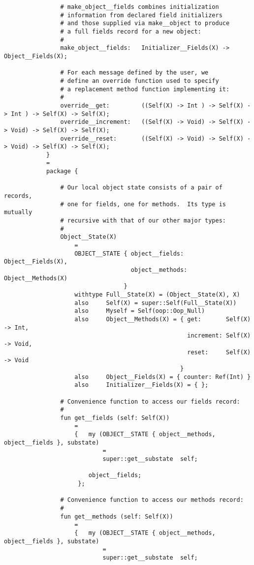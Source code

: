 \begin{verbatim}
                # make_object__fields combines initialization
                # information from declared field initializers
                # and those supplied via make__object to produce
                # a full fields record for a new object:
                # 
                make_object__fields:   Initializer__Fields(X) -> Object__Fields(X); 

                # For each message defined by the user, we
                # define an override function used to specify
                # a replacement method function implementing it:
                #
                override__get:         ((Self(X) -> Int ) -> Self(X) -> Int ) -> Self(X) -> Self(X);
                override__increment:   ((Self(X) -> Void) -> Self(X) -> Void) -> Self(X) -> Self(X);
                override__reset:       ((Self(X) -> Void) -> Self(X) -> Void) -> Self(X) -> Self(X);
            }
            =
            package {

                # Our local object state consists of a pair of records,
                # one for fields, one for methods.  Its type is mutually
                # recursive with that of our other major types:
                #
                Object__State(X)
                    =
                    OBJECT__STATE { object__fields:  Object__Fields(X), 
                                    object__methods: Object__Methods(X)
                                  }
                    withtype Full__State(X) = (Object__State(X), X)
                    also     Self(X) = super::Self(Full__State(X))
                    also     Myself = Self(oop::Oop_Null)
                    also     Object__Methods(X) = { get:       Self(X) -> Int,
                                                    increment: Self(X) -> Void, 
                                                    reset:     Self(X) -> Void
                                                  }
                    also     Object__Fields(X) = { counter: Ref(Int) }
                    also     Initializer__Fields(X) = { };

                # Convenience function to access our fields record:
                #
                fun get__fields (self: Self(X))
                    =
                    {   my (OBJECT__STATE { object__methods, object__fields }, substate)
                            =
                            super::get__substate  self;

                        object__fields;
                     };

                # Convenience function to access our methods record:
                #
                fun get__methods (self: Self(X))
                    =
                    {   my (OBJECT__STATE { object__methods, object__fields }, substate)
                            =
                            super::get__substate  self;


\end{verbatim}
